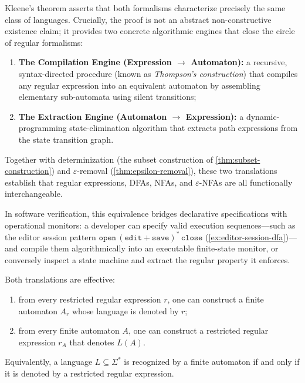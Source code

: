 Kleene's theorem asserts that both formalisms characterize precisely the same class of languages. Crucially, the proof is not an abstract non-constructive existence claim; it provides two concrete algorithmic engines that close the circle of regular formalisms:
\begin{enumerate}[nosep]
  \item \textbf{The Compilation Engine (Expression $\to$ Automaton):} a recursive, syntax-directed procedure (known as \emph{Thompson's construction}) that compiles any regular expression into an equivalent automaton by assembling elementary sub-automata using silent transitions;
  \item \textbf{The Extraction Engine (Automaton $\to$ Expression):} a dynamic-programming state-elimination algorithm that extracts path expressions from the state transition graph.
\end{enumerate}
Together with determinization (the subset construction of \cref{thm:subset-construction}) and $\varepsilon$-removal (\cref{thm:epsilon-removal}), these two translations establish that regular expressions, DFAs, NFAs, and $\varepsilon$-NFAs are all functionally interchangeable.

In software verification, this equivalence bridges declarative specifications with operational monitors: a developer can specify valid execution sequences---such as the editor session pattern $\texttt{open}\,(\texttt{edit}+\texttt{save})^*\,\texttt{close}$ (\cref{ex:editor-session-dfa})---and compile them algorithmically into an executable finite-state monitor, or conversely inspect a state machine and extract the regular property it enforces.

\begin{theorem}
\label{thm:kleene}
Both translations are effective:
\begin{enumerate}[nosep]
  \item from every restricted regular expression $r$, one can construct
  a finite automaton $A_r$ whose language is denoted by $r$;
  \item from every finite automaton $A$, one can construct a restricted
  regular expression $r_A$ that denotes $L(A)$.
\end{enumerate}
Equivalently, a language $L\subseteq\Sigma^*$ is recognized by a finite
automaton if and only if it is denoted by a restricted regular
expression.
\end{theorem}

